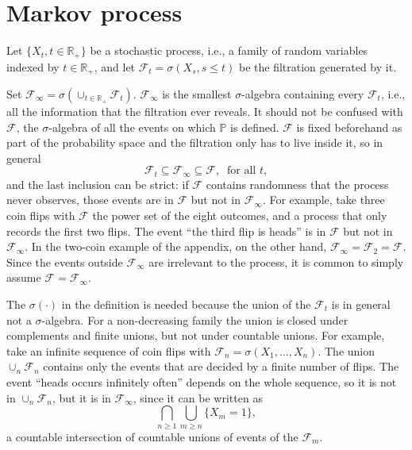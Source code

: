 \documentclass[11pt]{article}
\begin{document}
\section{Markov process}
Let $\{X_t,t\in\mathbb{R}_+\}$ be a stochastic process, i.e., a family of random variables indexed by $t\in\mathbb{R}_+$, and let $\mathcal{F}_t=\sigma(X_s,s\leq t)$ be the filtration generated by it.

Set $\mathcal{F}_{\infty}=\sigma(\cup_{t\in\mathbb{R}_+}\mathcal{F}_t)$. $\mathcal{F}_{\infty}$ is the smallest $\sigma$-algebra containing every $\mathcal{F}_t$, i.e., all the information that the filtration ever reveals. It should not be confused with $\mathcal{F}$, the $\sigma$-algebra of all the events on which $\mathbb{P}$ is defined. $\mathcal{F}$ is fixed beforehand as part of the probability space and the filtration only has to live inside it, so in general
$$\mathcal{F}_t\subseteq\mathcal{F}_{\infty}\subseteq\mathcal{F},\ \text{ for all }t,$$
and the last inclusion can be strict: if $\mathcal{F}$ contains randomness that the process never observes, those events are in $\mathcal{F}$ but not in $\mathcal{F}_{\infty}$. For example, take three coin flips with $\mathcal{F}$ the power set of the eight outcomes, and a process that only records the first two flips. The event ``the third flip is heads'' is in $\mathcal{F}$ but not in $\mathcal{F}_{\infty}$. In the two-coin example of the appendix, on the other hand, $\mathcal{F}_{\infty}=\mathcal{F}_2=\mathcal{F}$. Since the events outside $\mathcal{F}_{\infty}$ are irrelevant to the process, it is common to simply assume $\mathcal{F}=\mathcal{F}_{\infty}$.

The $\sigma(\cdot)$ in the definition is needed because the union of the $\mathcal{F}_t$ is in general not a $\sigma$-algebra. For a non-decreasing family the union is closed under complements and finite unions, but not under countable unions. For example, take an infinite sequence of coin flips with $\mathcal{F}_n=\sigma(X_1,\dots,X_n)$. The union $\cup_n\mathcal{F}_n$ contains only the events that are decided by a finite number of flips. The event ``heads occurs infinitely often'' depends on the whole sequence, so it is not in $\cup_n\mathcal{F}_n$, but it is in $\mathcal{F}_{\infty}$, since it can be written as
$$\bigcap_{n\geq 1}\bigcup_{m\geq n}\{X_m=1\},$$
a countable intersection of countable unions of events of the $\mathcal{F}_m$.
\end{document}
